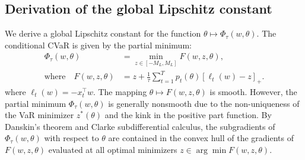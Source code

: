 \documentclass[smallcondensed]{svjour3}
\begin{document}
\subsection{Derivation of the global Lipschitz constant}\label{sec:lipschitz}

We derive a global Lipschitz constant for the function $\theta \mapsto \Phi_\tau(w, \theta)$. The conditional CVaR is given by the partial minimum:
\begin{equation}
\begin{split}
    \Phi_\tau(w, \theta) &= \min_{z \in [-M_L, M_L]} F(w, z, \theta),\\
    \text{where}\quad F(w, z, \theta) &= z + \frac{1}{\tau} \sum_{t=1}^T p_t(\theta) [\ell_t(w) - z]_+ .
\end{split}
\end{equation}
where $\ell_t(w) = -x_t^\top w$. The mapping $\theta \mapsto F(w, z, \theta)$ is smooth. However, the partial minimum $\Phi_\tau(w, \theta)$ is generally nonsmooth due to the non-uniqueness of the VaR minimizer $z^*(\theta)$ and the kink in the positive part function. By Danskin's theorem and Clarke subdifferential calculus, the subgradients of $\Phi_\tau(w, \theta)$ with respect to $\theta$ are contained in the convex hull of the gradients of $F(w, z, \theta)$ evaluated at all optimal minimizers $z \in \arg\min F(w, z, \theta)$.
\end{document}
